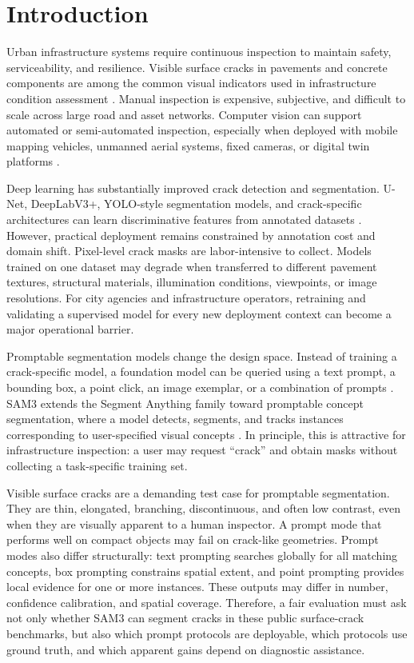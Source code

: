 \documentclass[applsci,article,submit,pdftex,moreauthors]{Definitions/mdpi}
\begin{document}
\section{Introduction}

Urban infrastructure systems require continuous inspection to maintain
safety, serviceability, and resilience. Visible surface cracks in
pavements and concrete components are among the common visual indicators
used in infrastructure condition assessment \cite{koch2015,sony2019}. Manual inspection
is expensive, subjective, and difficult to scale across large road and
asset networks. Computer vision can support automated or semi-automated
inspection, especially when deployed with mobile mapping vehicles,
unmanned aerial systems, fixed cameras, or digital twin platforms
\cite{koch2015,sony2019}.

Deep learning has substantially improved crack detection and
segmentation. U-Net, DeepLabV3+, YOLO-style segmentation models, and
crack-specific architectures can learn discriminative features from
annotated datasets \cite{shi2016,liu2019,yang2020,zhang2017,cha2017,mei2020,long2015,ronneberger2015,chen2018,he2017,xie2015}. However, practical deployment remains
constrained by annotation cost and domain shift. Pixel-level crack masks
are labor-intensive to collect. Models trained on one dataset may
degrade when transferred to different pavement textures, structural
materials, illumination conditions, viewpoints, or image resolutions.
For city agencies and infrastructure operators, retraining and
validating a supervised model for every new deployment context can
become a major operational barrier.

Promptable segmentation models change the design space. Instead of
training a crack-specific model, a foundation model can be queried using
a text prompt, a bounding box, a point click, an image exemplar, or a
combination of prompts \cite{kirillov2023,ravi2024,carion2025,ultralyticsSAM3,liu2023grounding}. SAM3 extends the Segment Anything
family toward promptable concept segmentation, where a model detects,
segments, and tracks instances corresponding to user-specified visual
concepts \cite{carion2025,liu2023grounding}. In principle, this is attractive for
infrastructure inspection: a user may request ``crack'' and obtain masks
without collecting a task-specific training set.

Visible surface cracks are a demanding test case for promptable
segmentation. They are thin, elongated, branching, discontinuous, and
often low contrast, even when they are visually apparent to a human
inspector. A prompt mode that performs well on compact objects may fail
on crack-like geometries. Prompt modes also differ structurally: text
prompting searches globally for all matching concepts, box prompting
constrains spatial extent, and point prompting provides local evidence
for one or more instances. These outputs may differ in number,
confidence calibration, and spatial coverage. Therefore, a fair
evaluation must ask not only whether SAM3 can segment cracks in these
public surface-crack benchmarks, but also which prompt protocols are
deployable, which protocols use ground truth, and which apparent gains
depend on diagnostic assistance.
\end{document}

